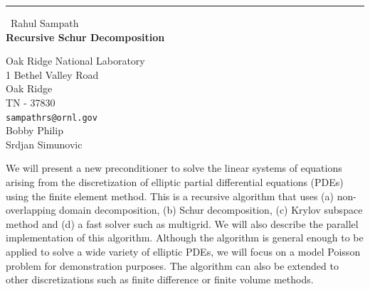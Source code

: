 \documentclass{report}
\begin{document}
\begin{center}
\rule{6in}{1pt} \
{\large Rahul Sampath \\
{\bf Recursive Schur Decomposition}}

Oak Ridge National Laboratory \\ 1 Bethel Valley Road \\ Oak Ridge \\ TN - 37830
\\
{\tt sampathrs@ornl.gov}\\
Bobby Philip\\
Srdjan Simunovic\end{center}

We will present a new preconditioner to solve the linear systems of
equations arising from the discretization of elliptic partial
differential equations (PDEs) using the finite element method. This is a
recursive algorithm that uses (a) non-overlapping domain decomposition,
(b) Schur decomposition, (c) Krylov subspace method and (d) a fast solver
such as multigrid. We will also describe the parallel implementation of
this algorithm. Although the algorithm is general enough to be applied to
solve a wide variety of elliptic PDEs, we will focus on a model Poisson
problem for demonstration purposes. The algorithm can also be extended to
other discretizations such as finite difference or finite volume methods.
\end{document}
